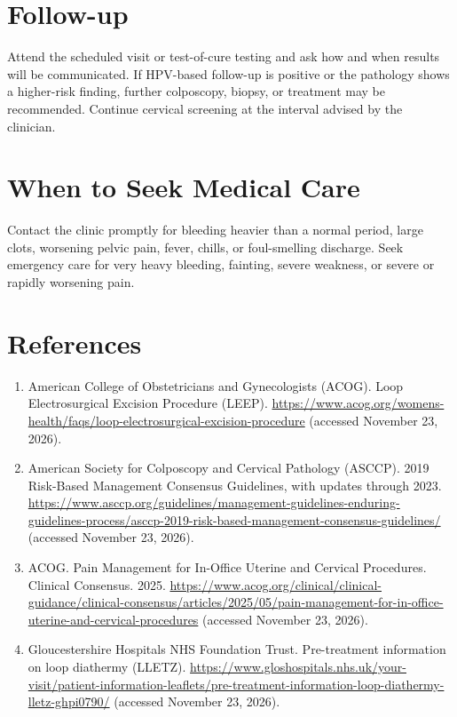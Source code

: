 \section*{Follow-up}
Attend the scheduled visit or test-of-cure testing and ask how and when results will be communicated. If HPV-based follow-up is positive or the pathology shows a higher-risk finding, further colposcopy, biopsy, or treatment may be recommended. Continue cervical screening at the interval advised by the clinician.

\section*{When to Seek Medical Care}
Contact the clinic promptly for bleeding heavier than a normal period, large clots, worsening pelvic pain, fever, chills, or foul-smelling discharge. Seek emergency care for very heavy bleeding, fainting, severe weakness, or severe or rapidly worsening pain.

\section*{References}
\begin{enumerate}
  \item American College of Obstetricians and Gynecologists (ACOG). Loop Electrosurgical Excision Procedure (LEEP). \url{https://www.acog.org/womens-health/faqs/loop-electrosurgical-excision-procedure} (accessed November 23, 2026).
  \item American Society for Colposcopy and Cervical Pathology (ASCCP). 2019 Risk-Based Management Consensus Guidelines, with updates through 2023. \url{https://www.asccp.org/guidelines/management-guidelines-enduring-guidelines-process/asccp-2019-risk-based-management-consensus-guidelines/} (accessed November 23, 2026).
  \item ACOG. Pain Management for In-Office Uterine and Cervical Procedures. Clinical Consensus. 2025. \url{https://www.acog.org/clinical/clinical-guidance/clinical-consensus/articles/2025/05/pain-management-for-in-office-uterine-and-cervical-procedures} (accessed November 23, 2026).
  \item Gloucestershire Hospitals NHS Foundation Trust. Pre-treatment information on loop diathermy (LLETZ). \url{https://www.gloshospitals.nhs.uk/your-visit/patient-information-leaflets/pre-treatment-information-loop-diathermy-lletz-ghpi0790/} (accessed November 23, 2026).
\end{enumerate}

\clearpage
